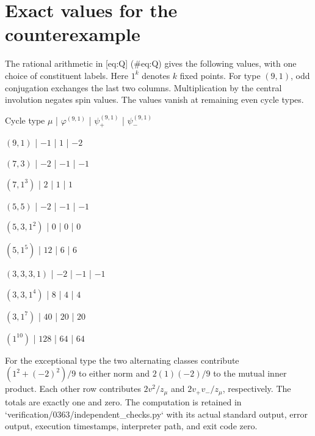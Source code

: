 \documentclass[10pt]{article}
\begin{document}
\section*{Exact values for the counterexample}
The rational arithmetic in [eq:Q] (\#eq:Q) gives the following values, with one choice of constituent labels. Here \(1^k\) denotes \(k\) fixed points. For type \((9,1)\), odd conjugation exchanges the last two columns. Multiplication by the central involution negates spin values. The values vanish at remaining even cycle types.\par
Cycle type \(\mu\) | \(\varphi^{(9,1)}\) | \(\psi_+^{(9,1)}\) | \(\psi_-^{(9,1)}\)\par
\((9,1)\) | \(-1\) | \(1\) | \(-2\)\par
\((7,3)\) | \(-2\) | \(-1\) | \(-1\)\par
\((7,1^3)\) | \(2\) | \(1\) | \(1\)\par
\((5,5)\) | \(-2\) | \(-1\) | \(-1\)\par
\((5,3,1^2)\) | \(0\) | \(0\) | \(0\)\par
\((5,1^5)\) | \(12\) | \(6\) | \(6\)\par
\((3,3,3,1)\) | \(-2\) | \(-1\) | \(-1\)\par
\((3,3,1^4)\) | \(8\) | \(4\) | \(4\)\par
\((3,1^7)\) | \(40\) | \(20\) | \(20\)\par
\((1^{10})\) | \(128\) | \(64\) | \(64\)\par
For the exceptional type the two alternating classes contribute \((1^2+(-2)^2)/9\) to either norm and \(2(1)(-2)/9\) to the mutual inner product. Each other row contributes \(2v^2/z_\mu\) and \(2v_+v_-/z_\mu\), respectively. The totals are exactly one and zero. The computation is retained in `verification/0363/independent\_checks.py` with its actual standard output, error output, execution timestamps, interpreter path, and exit code zero.\par
\end{document}
